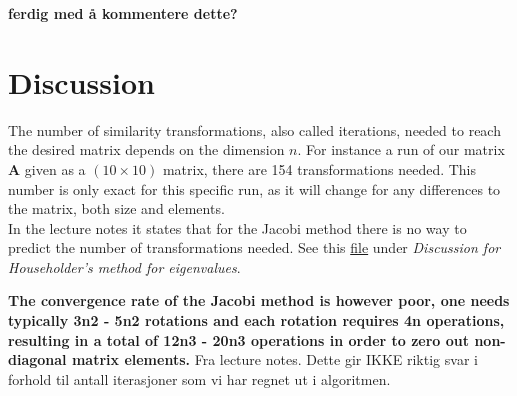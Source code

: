 \documentclass{article}
\begin{document}
  \textbf{ferdig med å kommentere dette?}

\vspace{1cm}

\section{Discussion} \label{sec:Discussion}

  The number of similarity transformations, also called iterations, needed to reach the desired matrix depends on the dimension $n$. For instance a run of our matrix \textbf{A} given as a $(10 \times 10)$ matrix, there are 154 transformations needed. This number is only exact for this specific run, as it will change for any differences to the matrix, both size and elements. \\

  In the lecture notes it states that for the Jacobi method there is no way to predict the number of transformations needed. See this \href{http://compphysics.github.io/ComputationalPhysics/doc/pub/eigvalues/html/eigvalues.html}{file} under \textit{Discussion for Householder's method for eigenvalues}.

  \textbf{The convergence rate of the Jacobi method is however poor, one needs typically 3n2 - 5n2 rotations and each rotation requires 4n operations, resulting in a total of 12n3 - 20n3 operations in order to zero out non-diagonal matrix elements.} Fra lecture notes. Dette gir IKKE riktig svar i forhold til antall iterasjoner som vi har regnet ut i algoritmen. \\
\end{document}
